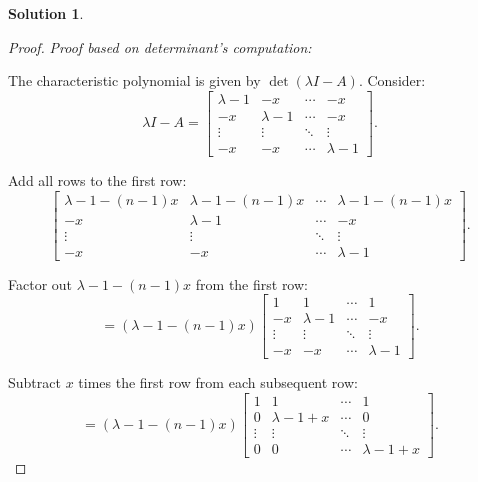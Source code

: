 \documentclass[12pt]{article}
\theoremstyle{definition}
\newtheorem*{solution}{\normalfont\textbf{Solution}}
\begin{document}
\begin{enumerate}[leftmargin=*]
\begin{solution}
\begin{proof}
                    \textit{Proof based on determinant's computation:}
                    
                    The characteristic polynomial is given by \(\det(\lambda I - A)\). Consider:
                    \[
                    \lambda I - A = \begin{bmatrix}
                    \lambda - 1 & -x & \cdots & -x \\
                    -x & \lambda - 1 & \cdots & -x \\
                    \vdots & \vdots & \ddots & \vdots \\
                    -x & -x & \cdots & \lambda - 1
                    \end{bmatrix}.
                    \]

                    Add all rows to the first row:
                    \[
                    \begin{bmatrix}
                    \lambda - 1 - (n-1)x & \lambda - 1 - (n-1)x & \cdots & \lambda - 1 - (n-1)x \\
                    -x & \lambda - 1 & \cdots & -x \\
                    \vdots & \vdots & \ddots & \vdots \\
                    -x & -x & \cdots & \lambda - 1
                    \end{bmatrix}.
                    \]

                    Factor out \(\lambda - 1 - (n-1)x\) from the first row:
                    \[
                    = \left( \lambda - 1 - (n-1)x \right) \begin{bmatrix}
                    1 & 1 & \cdots & 1 \\
                    -x & \lambda - 1 & \cdots & -x \\
                    \vdots & \vdots & \ddots & \vdots \\
                    -x & -x & \cdots & \lambda - 1
                    \end{bmatrix}.
                    \]

                    Subtract \(x\) times the first row from each subsequent row:
                    \[
                    = \left( \lambda - 1 - (n-1)x \right) \begin{bmatrix}
                    1 & 1 & \cdots & 1 \\
                    0 & \lambda - 1 + x & \cdots & 0 \\
                    \vdots & \vdots & \ddots & \vdots \\
                    0 & 0 & \cdots & \lambda - 1 + x
                    \end{bmatrix}.
                    \]


\end{proof}
\end{solution}
\end{enumerate}
\end{document}
